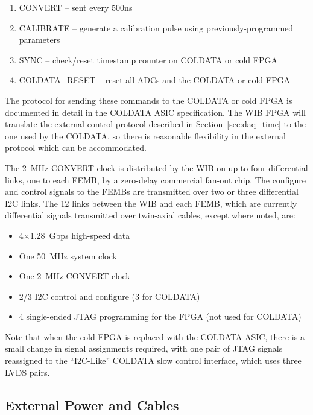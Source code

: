 \begin{enumerate}
  \item CONVERT -- sent every 500ns
  \item CALIBRATE -- generate a calibration pulse using
    previously-programmed parameters
  \item SYNC -- check/reset timestamp counter on COLDATA or cold FPGA
  \item COLDATA\_RESET -- reset all ADCs and the COLDATA or cold FPGA
\end{enumerate}

The protocol for sending these commands to the COLDATA or cold FPGA is
documented in detail in the COLDATA ASIC specification.  The WIB FPGA
will translate the external control protocol described in Section~\ref{sec:daq_time} to the one used by the
COLDATA, so there is reasonable flexibility in the external protocol
which can be accommodated.

The 2~MHz CONVERT clock is distributed by the WIB on up to four differential
links, one to each FEMB, by a zero-delay commercial fan-out chip. The
configure and control signals to the FEMBs are transmitted over two or three
differential I2C links. The 12 links between the WIB and each FEMB,
which are currently differential signals transmitted over twin-axial
cables, except where noted, are:

\begin{itemize}
    \item 4$\times$1.28~Gbps high-speed data
    \item One 50~MHz system clock
    \item One 2~MHz CONVERT clock
    \item 2/3 I2C control and configure (3 for COLDATA)
    \item 4 single-ended JTAG programming for the FPGA (not used for COLDATA)
\end{itemize}

Note that when the cold FPGA is replaced with the COLDATA ASIC, there
is a small change in signal assignments required, with one pair of
JTAG signals reassigned to the ``I2C-Like'' COLDATA slow control
interface, which uses three LVDS pairs.

%
\subsection{External Power and Cables}
\label{subsec:ce_feedthrough_power}

%
